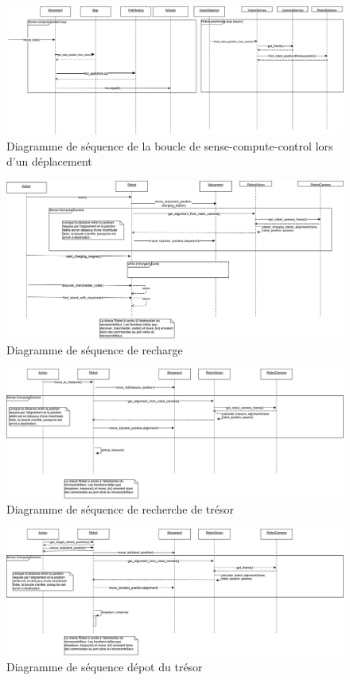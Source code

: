 \begin{landscape}
\begin{figure}
  \centering
  \includegraphics[scale=0.45, angle=0]{resources/diagrams/robotMovement.pdf}
  \caption{Diagramme de séquence de la boucle de sense-compute-control lors d'un déplacement}
\end{figure}

\begin{figure}
  \centering
  \includegraphics[scale=0.5, angle=0]{resources/diagrams/rechargeAction.pdf}
  \caption{Diagramme de séquence de recharge}
\end{figure}

\begin{figure}
  \centering
  \includegraphics[scale=0.4, angle=0]{resources/diagrams/findTreasureAction.pdf}
  \caption{Diagramme de séquence de recherche de trésor}
\end{figure}

\begin{figure}
  \centering
  \includegraphics[scale=0.5, angle=0]{resources/diagrams/depositAction.pdf}
  \caption{Diagramme de séquence dépot du trésor}
\end{figure}
\end{landscape}
